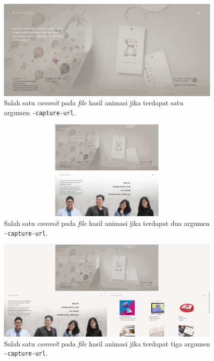\begin{figure}[H]
	\centering
		\includegraphics[scale=0.3]{Gambar/capture1.png}
	\caption{Salah satu \textit{commit} pada \textit{file} hasil animasi jika terdapat satu argumen \texttt{-capture-url}.}
	\label{fig:capture1}
\end{figure}



\begin{figure}[H]
	\centering
		\includegraphics[scale=0.3]{Gambar/capture2.png}
	\caption{Salah satu \textit{commit} pada \textit{file} hasil animasi jika terdapat dua argumen \texttt{-capture-url}.}
	\label{fig:capture2}
\end{figure}



\begin{figure}[H]
	\centering
		\includegraphics[scale=0.3]{Gambar/capture3.png}
	\caption{Salah satu \textit{commit} pada \textit{file} hasil animasi jika terdapat tiga argumen \texttt{-capture-url}.}
	\label{fig:capture3}
\end{figure}


